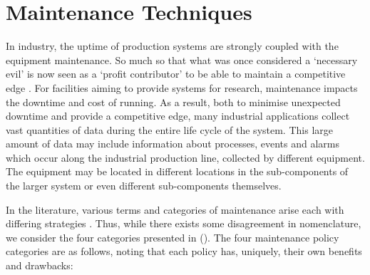 \documentclass[10pt,oneside]{report}
\begin{document}
\section{Maintenance Techniques}\label{sec:maintenanceTechniques}
In industry, the uptime of production systems are strongly coupled with the equipment maintenance. So much so that what was once considered a `necessary evil' is now seen as a `profit contributor' to be able to maintain a competitive edge \cite{waeyenbergh2002framework, faccio2014industrial}. For facilities aiming to provide systems for research, maintenance impacts the downtime and cost of running. As a result, both to minimise unexpected downtime and provide a competitive edge, many industrial applications collect vast quantities of data during the entire life cycle of the system. This large amount of data may include information about processes, events and alarms \cite{carvalho2019systematic} which occur along the industrial production line, collected by different equipment. The equipment may be located in different locations in the sub-components of the larger system or even different sub-components themselves. 

In the literature, various terms and categories of maintenance arise each with differing strategies \cite{susto2012predictive, mobley2002introduction, susto2016dealing}. Thus, while there exists some disagreement in nomenclature, we consider the four categories presented in (\citet{susto2012predictive}). The four maintenance policy categories are as follows, noting that each policy has, uniquely, their own benefits and drawbacks:
\end{document}
